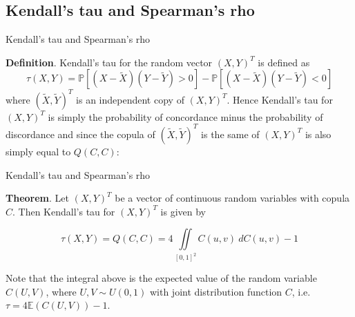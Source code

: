\documentclass[11pt]{beamer}
\theoremstyle{plain}
\theoremstyle{definition}
\theoremstyle{remark}
\begin{document}
\subsection{Kendall's tau and Spearman's rho}
\begin{frame}{Kendall's tau and Spearman's rho}

		\textbf{Definition}. Kendall's tau for the random vector $(X, Y)^T$ is defined as
		\begin{equation}
		\tau (X, Y) =\mathbb{P}[(X-\tilde X)(Y-\tilde Y) > 0]-\mathbb{P}[(X-\tilde X)(Y-\tilde Y) < 0] 
		\end{equation}
		where $(\tilde X, \tilde Y)^T$ is an independent copy of $(X, Y)^T$.
		Hence Kendall's tau for $(X, Y)^T$ is simply the probability of concordance minus the probability of discordance and since the 
		copula of  $(\tilde X, \tilde Y)^T$ is the same of $(X, Y)^T$ is also simply equal to $Q(C, C)$:
		
\end{frame}
%
\begin{frame}{Kendall's tau and Spearman's rho}

		\noindent\textbf{Theorem}. Let $(X, Y)^T$ be a vector of continuous random variables with copula $C$. Then Kendall's tau for 
		$(X, Y)^T$ is given by 
		
		\begin{equation}
		\tau (X,Y) = Q(C, C) = 4 \iint\limits_{[0, 1]^2} C(u, v) \> dC(u, v) - 1
		\end{equation}
		
		\noindent Note that the integral above is the expected value of the random variable $C(U, V)$, where $U, V \sim U(0, 1)$ with 
		joint distribution function $C$, i.e. $\tau = 4 \mathbb{E}(C(U,V)) - 1$.

\end{frame}
%
\end{document}
